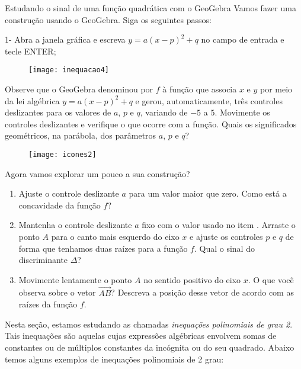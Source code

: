 \clearpage
\begin{task}{Estudando o sinal de uma função quadrática com o GeoGebra}
Vamos fazer uma construção usando o GeoGebra. Siga os seguintes passos:

1-	Abra a janela gráfica e escreva $y=a(x-p)^2+q$ no campo de entrada e tecle ENTER;

\begin{figure}[H]
\centering
\noindent\texttt{[image: inequacao4]}
\end{figure}

Observe que o GeoGebra denominou por $f$ à função que associa $x$ e $y$ por meio da lei algébrica $y=a(x-p)^2+q$ e gerou, automaticamente, três controles deslizantes para os valores de $a$, $p$ e $q$, variando de $-5$ a $5$. Movimente os controles deslizantes e verifique o que ocorre com a função. Quais os significados geométricos, na parábola, dos parâmetros $a$, $p$ e $q$?

\begin{figure}[H]
\centering
\noindent\texttt{[image: icones2]}
\end{figure}
Agora vamos explorar um pouco a sua construção?

\begin{enumerate}
\item{} Ajuste o controle deslizante $a$ para um valor maior que zero. Como está a concavidade da função $f$?

\item {} Mantenha o controle deslizante $a$ fixo com o valor usado no item . Arraste o ponto $A$ para o canto mais esquerdo do eixo $x$ e ajuste os controles $p$ e $q$ de forma que tenhamos duas raízes para a função $f$. Qual o sinal do discriminante $\Delta$?

\item{}	
Movimente lentamente o ponto $A$ no sentido positivo do eixo $x$. O que você observa sobre o vetor $\overrightarrow{AB}$? Descreva a posição desse vetor de acordo com as raízes da função $f$.
\end{enumerate}

\end{task}

\label{\detokenize{AF107-8:inequacoes-grau2}}\label{\detokenize{AF107-8::doc}}
Nesta seção, estamos estudando as chamadas \emph{inequações polinomiais de grau 2}. Tais inequações são aquelas cujas expressões algébricas envolvem somas de constantes ou de múltiplos constantes da incógnita ou do seu quadrado. Abaixo temos alguns exemplos de inequações polinomiais de 2 grau:

